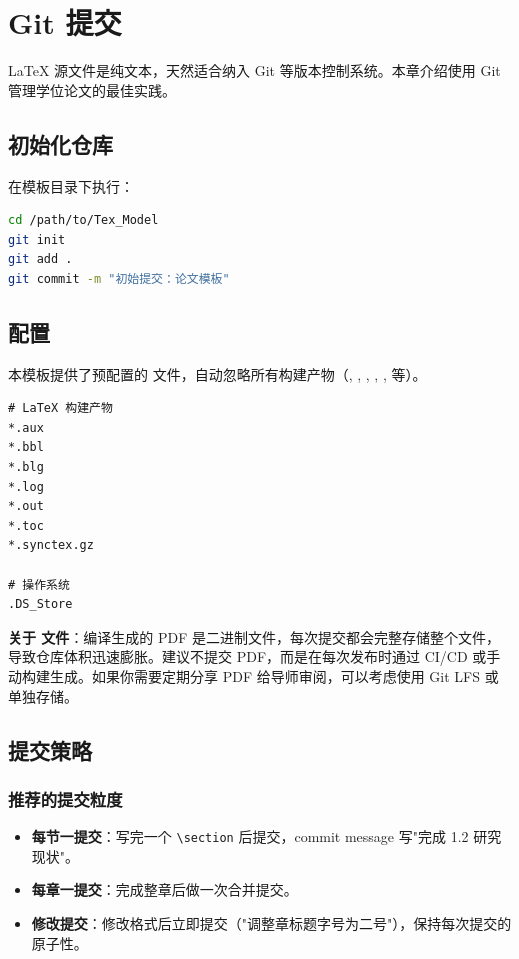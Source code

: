 \documentclass[../main-manual.tex]{subfiles}
\begin{document}
\cleardoublepage
\thispagestyle{empty}
 \songti
\setlength{\baselineskip}{24pt}
\RaggedRight
\setlength{\parindent}{2em}
\raggedbottom

\chapter{Git 提交} \label{ch:git}

\LaTeX{} 源文件是纯文本，天然适合纳入 Git 等版本控制系统。本章介绍使用 Git 管理学位论文的最佳实践。

\section{初始化仓库}

在模板目录下执行：

\begin{lstlisting}[language=bash, caption={初始化 Git 仓库}]
cd /path/to/Tex_Model
git init
git add .
git commit -m "初始提交：论文模板"
\end{lstlisting}

\section{ 配置}

本模板提供了预配置的  文件，自动忽略所有构建产物（, , , , ,  等）。

\begin{lstlisting}[caption={.gitignore 关键规则}]
# LaTeX 构建产物
*.aux
*.bbl
*.blg
*.log
*.out
*.toc
*.synctex.gz

# 操作系统
.DS_Store
\end{lstlisting}

\textbf{关于  文件}：编译生成的 PDF 是二进制文件，每次提交都会完整存储整个文件，导致仓库体积迅速膨胀。建议不提交 PDF，而是在每次发布时通过 CI/CD 或手动构建生成。如果你需要定期分享 PDF 给导师审阅，可以考虑使用 Git LFS 或单独存储。

\section{提交策略}

\subsection{推荐的提交粒度}

\begin{itemize}
	\item \textbf{每节一提交}：写完一个 \verb|\section| 后提交，commit message 写"完成 1.2 研究现状"。
	\item \textbf{每章一提交}：完成整章后做一次合并提交。
	\item \textbf{修改提交}：修改格式后立即提交（"调整章标题字号为二号"），保持每次提交的原子性。
\end{itemize}
\end{document}
